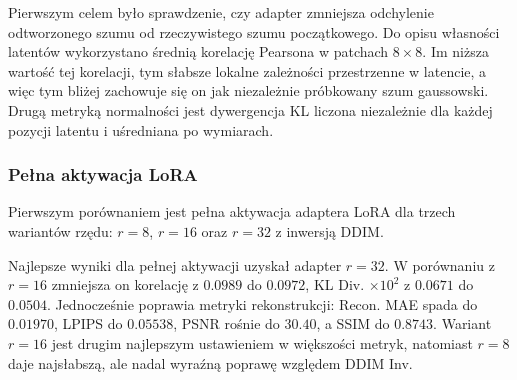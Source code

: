 \documentclass[
    left=2.5cm,
    right=2.5cm,
    top=2.5cm,
    bottom=3cm,
    bindingoffset=6mm,
    nohyphenation=false
]{szablon/eiti/sprawozdanie}
\begin{document}
Pierwszym celem było sprawdzenie, czy adapter zmniejsza odchylenie
odtworzonego szumu od rzeczywistego szumu początkowego. Do opisu własności
latentów wykorzystano średnią korelację Pearsona w patchach $8 \times 8$.
Im niższa wartość tej korelacji, tym słabsze lokalne zależności przestrzenne
w latencie, a więc tym bliżej zachowuje się on jak niezależnie próbkowany
szum gaussowski. Drugą metryką normalności jest dywergencja KL liczona
niezależnie dla każdej pozycji latentu i uśredniana po wymiarach.

\subsubsection{Pełna aktywacja LoRA}

Pierwszym porównaniem jest pełna aktywacja adaptera LoRA dla trzech
wariantów rzędu: $r=8$, $r=16$ oraz $r=32$ z inwersją DDIM.

\begin{table}[H]
    \centering
    \caption{Porównanie adapterów LoRA dla różnych rzędów z inwersją DDIM.}
    \label{tab:lora-rank-comparison}
\end{table}

Najlepsze wyniki dla pełnej aktywacji uzyskał adapter $r=32$. W porównaniu
z $r=16$ zmniejsza on korelację z $0.0989$ do $0.0972$, KL Div.
$\times 10^2$ z $0.0671$ do $0.0504$. Jednocześnie poprawia metryki rekonstrukcji: Recon. MAE spada do
$0.01970$, LPIPS\cite{DBLP:journals/corr/abs-1801-03924} do $0.05538$, PSNR rośnie do $30.40$, a SSIM do $0.8743$.
Wariant $r=16$ jest drugim najlepszym ustawieniem w większości metryk,
natomiast $r=8$ daje najsłabszą, ale nadal wyraźną poprawę względem DDIM
Inv.
\end{document}
